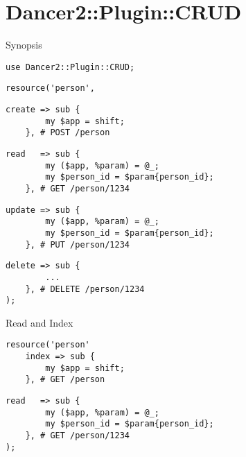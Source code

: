 \documentclass[aspectratio=1610]{beamer}
\begin{document}

\section{Dancer2::Plugin::CRUD}


\begin{frame}[fragile]{Synopsis}

\begin{lstlisting}
use Dancer2::Plugin::CRUD;
\end{lstlisting}\pause\begin{lstlisting}[firstnumber=last]
resource('person',
\end{lstlisting}\pause\begin{lstlisting}[firstnumber=last]
    create => sub {
        my $app = shift;
    }, # POST /person
\end{lstlisting}\pause\begin{lstlisting}[firstnumber=last]
    read   => sub {
        my ($app, %param) = @_;
        my $person_id = $param{person_id};
    }, # GET /person/1234
\end{lstlisting}\pause\begin{lstlisting}[firstnumber=last]
    update => sub {
        my ($app, %param) = @_;
        my $person_id = $param{person_id};
    }, # PUT /person/1234
\end{lstlisting}\pause\begin{lstlisting}[firstnumber=last]
    delete => sub {
        ...
    }, # DELETE /person/1234
);
\end{lstlisting}
\end{frame}


\begin{frame}[fragile]{Read and Index}

\begin{lstlisting}
resource('person'
    index => sub {
        my $app = shift;
    }, # GET /person
\end{lstlisting}\pause\begin{lstlisting}[firstnumber=last]
    read   => sub {
        my ($app, %param) = @_;
        my $person_id = $param{person_id};
    }, # GET /person/1234
);
\end{lstlisting}
\end{frame}
\end{document}
